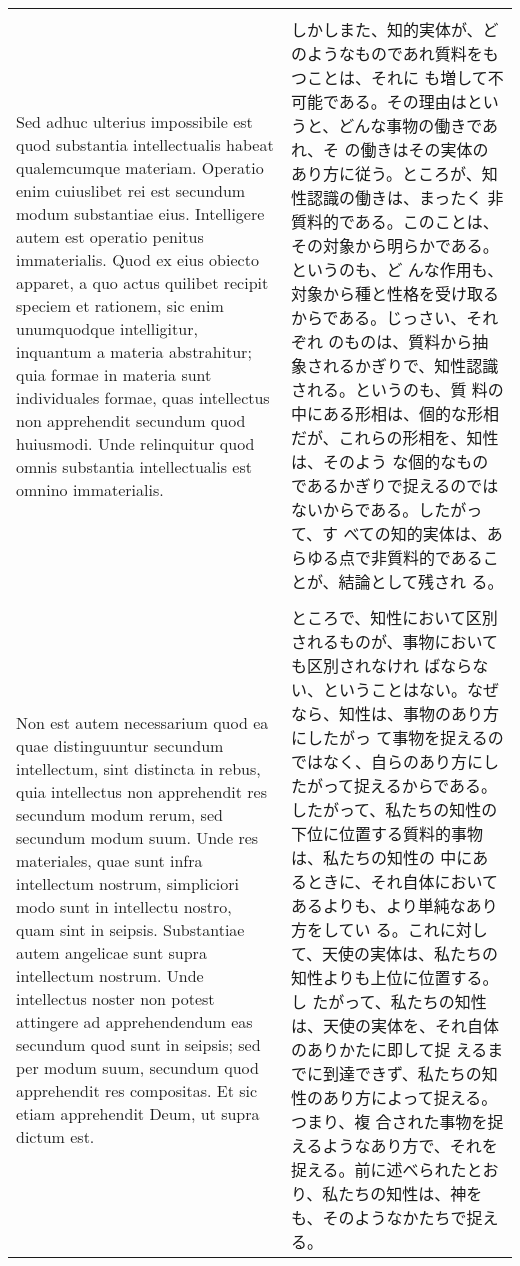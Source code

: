 \documentclass[10pt]{jsarticle} %
\begin{document}
\begin{longtable}{p{21em}p{21em}}
 \\\\

 Sed adhuc ulterius impossibile est quod substantia intellectualis
 habeat qualemcumque materiam. Operatio enim cuiuslibet rei est
 secundum modum substantiae eius. Intelligere autem est operatio
 penitus immaterialis. Quod ex eius obiecto apparet, a quo actus
 quilibet recipit speciem et rationem, sic enim unumquodque
 intelligitur, inquantum a materia abstrahitur; quia formae in materia
 sunt individuales formae, quas intellectus non apprehendit secundum
 quod huiusmodi. Unde relinquitur quod omnis substantia intellectualis
 est omnino immaterialis.


 &

 しかしまた、知的実体が、どのようなものであれ質料をもつことは、それに
 も増して不可能である。その理由はというと、どんな事物の働きであれ、そ
 の働きはその実体のあり方に従う。ところが、知性認識の働きは、まったく
 非質料的である。このことは、その対象から明らかである。というのも、ど
 んな作用も、対象から種と性格を受け取るからである。じっさい、それぞれ
 のものは、質料から抽象されるかぎりで、知性認識される。というのも、質
 料の中にある形相は、個的な形相だが、これらの形相を、知性は、そのよう
 な個的なものであるかぎりで捉えるのではないからである。したがって、す
 べての知的実体は、あらゆる点で非質料的であることが、結論として残され
 る。

\\\\

 Non est autem necessarium quod ea quae distinguuntur secundum
 intellectum, sint distincta in rebus, quia intellectus non
 apprehendit res secundum modum rerum, sed secundum modum suum. Unde
 res materiales, quae sunt infra intellectum nostrum, simpliciori modo
 sunt in intellectu nostro, quam sint in seipsis. Substantiae autem
 angelicae sunt supra intellectum nostrum. Unde intellectus noster non
 potest attingere ad apprehendendum eas secundum quod sunt in seipsis;
 sed per modum suum, secundum quod apprehendit res compositas. Et sic
 etiam apprehendit Deum, ut supra dictum est.


&

 ところで、知性において区別されるものが、事物においても区別されなけれ
 ばならない、ということはない。なぜなら、知性は、事物のあり方にしたがっ
 て事物を捉えるのではなく、自らのあり方にしたがって捉えるからである。
 したがって、私たちの知性の下位に位置する質料的事物は、私たちの知性の
 中にあるときに、それ自体においてあるよりも、より単純なあり方をしてい
 る。これに対して、天使の実体は、私たちの知性よりも上位に位置する。し
 たがって、私たちの知性は、天使の実体を、それ自体のありかたに即して捉
 えるまでに到達できず、私たちの知性のあり方によって捉える。つまり、複
 合された事物を捉えるようなあり方で、それを捉える。前に述べられたとお
 り、私たちの知性は、神をも、そのようなかたちで捉える。



\end{longtable}
\end{document}

